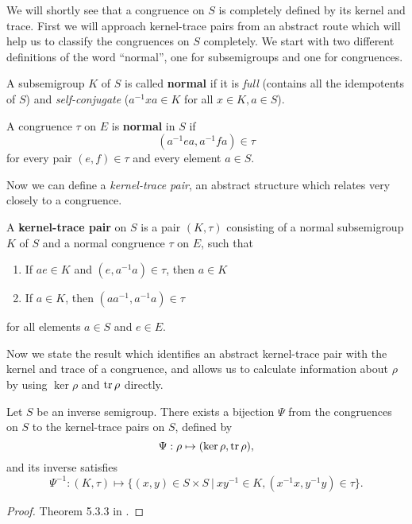 We will shortly see that a congruence on $S$ is completely defined by its kernel
and trace.  First we will approach kernel-trace pairs from an abstract route
which will help us to classify the congruences on $S$ completely.  We start with
two different definitions of the word ``normal'', one for subsemigroups and one
for congruences.

\begin{definition}
  \label{def:kernel-normal}
  A subsemigroup $K$ of $S$ is called \textbf{normal} if it is
  \textit{full} (contains all the idempotents of $S$) and
  \textit{self-conjugate} ($a^{-1}xa \in K$ for all $x \in K, a \in S$).
\end{definition}

\begin{definition}
  \label{def:trace-normal}
  A congruence $\tau$ on $E$ is \textbf{normal} in $S$ if
  $$(a^{-1}ea,a^{-1}fa) \in \tau$$
  for every pair $(e,f) \in \tau$ and every element $a \in S$.
\end{definition}

Now we can define a \textit{kernel-trace pair}, an abstract structure which
relates very closely to a congruence.

\begin{definition}
  \label{def:kernel-trace-pair}
  A \textbf{kernel-trace pair} on $S$ is a pair $(K,\tau)$ consisting of a
  normal subsemigroup $K$ of $S$ and a normal congruence $\tau$ on $E$, such
  that
  \begin{enumerate}
  \item If $ae \in K$ and $(e,a^{-1}a) \in \tau$, then $a \in K$
  \item If $a \in K$, then $(aa^{-1},a^{-1}a) \in \tau$
  \end{enumerate}
  for all elements $a \in S$ and $e \in E$.
\end{definition}

Now we state the result which identifies an abstract kernel-trace pair with the
kernel and trace of a congruence, and allows us to calculate information about
$\rho$ by using $\ker \rho$ and $\operatorname{tr} \rho$ directly.

\begin{theorem}
  \label{thm:kernel-trace-pair}

  Let $S$ be an inverse semigroup.  There exists a bijection $\Psi$ from the
  congruences on $S$ to the kernel-trace pairs on $S$, defined by
  $$\Psi: \rho \mapsto (\ker\rho, \operatorname{tr}\rho),$$
  and its inverse satisfies
  $$\Psi^{-1} : (K,\tau) \mapsto
  \{(x,y) \in S \times S ~|~ xy^{-1} \in K, (x^{-1}x, y^{-1}y) \in \tau\}.$$
  \begin{proof}
    Theorem 5.3.3 in \cite{howie}.
  \end{proof}
\end{theorem}

